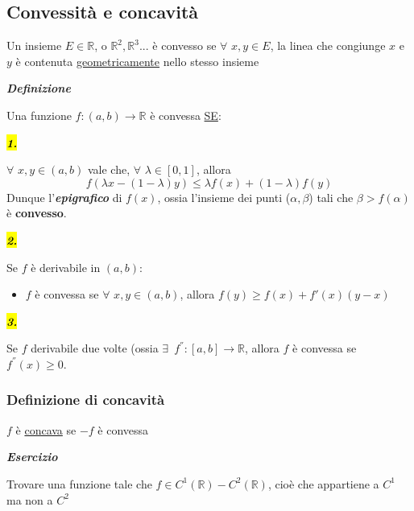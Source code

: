 \documentclass{article}
\theoremstyle{definition}
\newcommand{\R}{\mathbb{R}}
\begin{document}
\subsection{Convessità e concavità}
Un insieme $E \in \R$, o $\R^2,\R^3...$ è convesso se $\forall \,\, x,y \in E$, la linea che congiunge $x$ e $y$ è contenuta \underline{geometricamente} nello stesso insieme
\begin{center}
    \textbf{\textit{Definizione}}
\end{center}
Una funzione $f: (a,b) \to \R$ è convessa \underline{SE}:
\begin{center}
    \textbf{\textit{\hl{1.}}}
\end{center}
$\forall \,\, x,y \in (a,b)$ vale che, $\forall \,\, \lambda \in [0,1]$, allora
\begin{equation*}
    f(\lambda x - (1-\lambda)y) \leqslant \lambda f(x) + (1-\lambda)f(y)
\end{equation*}
Dunque l'\textit{\textbf{epigrafico}} di $f(x)$, ossia l'insieme dei punti ($\alpha, \beta$) tali che $\beta > f(\alpha)$ è \textbf{convesso}.
\begin{center}
    \textbf{\textit{\hl{2.}}}
\end{center}
Se $f$ è derivabile in $(a,b)$:
\begin{itemize}
\item $f$ è convessa se $\forall \,\, x,y \in (a,b)$, allora $f(y) \geqslant f(x)+f'(x)(y-x)$
\end{itemize}
\begin{center}
    \textbf{\textit{\hl{3.}}}
\end{center}
Se $f$ derivabile due volte (ossia $\exists \,\,\, f^{''} : [a,b] \to \R$, allora $f$ è convessa se $f^{''}(x) \geqslant 0$.
\subsubsection{Definizione di concavità}
$f$ è \underline{concava} se $-f$ è convessa 
\begin{center}
    \textbf{\textit{Esercizio}}
\end{center}
Trovare una funzione tale che $f \in C^1(\R) - C^2(\R)$, cioè che appartiene a $C^1$ ma non a $C^2$
\end{document}
